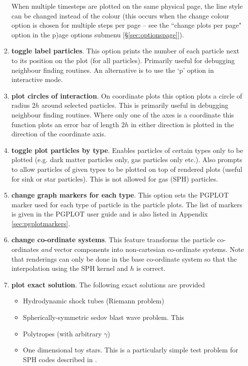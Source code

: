 \documentclass[a4paper,11pt]{article}
\begin{document}
\begin{enumerate}
 When multiple timesteps are plotted on the same physical page, the line style can be
changed instead of the colour (this occurs when the change colour option is chosen for multiple steps per page
-- see the ``change plots per page" option in the p)age options submenu [\S\vref{sec:optionspage}]).
\item \textbf{toggle label particles}. This option prints the number of each particle
next to its position on the plot (for all particles). Primarily useful for debugging neighbour finding
routines. An alternative is to use the `p' option in interactive mode.
\item \textbf{plot circles of interaction}. On coordinate plots this option plots a circle of
radius $2h$ around selected particles. 
This is primarily useful in debugging neighbour finding routines. Where only one of the axes is a 
coordinate this function plots an error bar of length $2h$ in either direction is plotted
in the direction of the coordinate axis.
\item \textbf{toggle plot particles by type}. Enables particles of certain types only to be plotted
(e.g. dark matter particles only, gas particles only etc.). Also prompts to allow particles of given types to be
plotted on top of rendered plots (useful for sink or star particles). This is not allowed for gas
(SPH) particles.
\item \textbf{change graph markers for each type}. This option sets the PGPLOT marker used for each
type of particle in the particle plots. The list of markers is given in the
PGPLOT user guide and is also listed in Appendix \ref{sec:pgplotmarkers}. 
\item \textbf{change co-ordinate systems}. This feature transforms the particle
co-ordinates \emph{and} vector components into non-cartesian co-ordinate systems. Note that
renderings can only be done in the base co-ordinate system so that the interpolation using the SPH
kernel and $h$ is correct.  
\item \textbf{plot exact solution}. The following exact solutions are provided
\begin{itemize}
\item Hydrodynamic shock tubes (Riemann problem)
\item Spherically-symmetric sedov blast wave problem. This
\item Polytropes (with arbitrary $\gamma$)
\item One dimensional toy stars. This is a particularly simple test
problem for SPH codes described in \citet{mp04}.

\end{itemize}
\end{enumerate}
\end{document}
